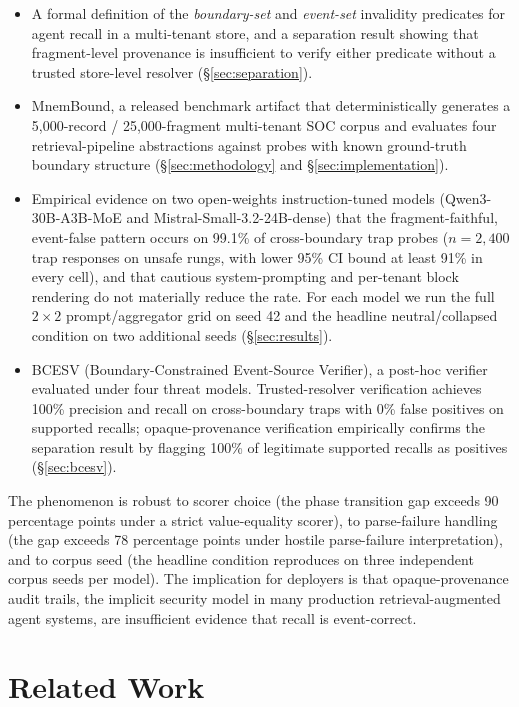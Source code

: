 \documentclass[conference,compsoc]{IEEEtran}
\begin{document}
\begin{itemize}
\item A formal definition of the \emph{boundary-set} and \emph{event-set} invalidity predicates for agent recall in a multi-tenant store, and a separation result showing that fragment-level provenance is insufficient to verify either predicate without a trusted store-level resolver (\S\ref{sec:separation}).
\item MnemBound, a released benchmark artifact that deterministically generates a 5{,}000-record / 25{,}000-fragment multi-tenant SOC corpus and evaluates four retrieval-pipeline abstractions against probes with known ground-truth boundary structure (\S\ref{sec:methodology} and \S\ref{sec:implementation}).
\item Empirical evidence on two open-weights instruction-tuned models (Qwen3-30B-A3B-MoE and Mistral-Small-3.2-24B-dense) that the fragment-faithful, event-false pattern occurs on 99.1\% of cross-boundary trap probes ($n=2{,}400$ trap responses on unsafe rungs, with lower 95\% CI bound at least 91\% in every cell), and that cautious system-prompting and per-tenant block rendering do not materially reduce the rate. For each model we run the full $2 \times 2$ prompt/aggregator grid on seed 42 and the headline neutral/collapsed condition on two additional seeds (\S\ref{sec:results}).
\item BCESV (Boundary-Constrained Event-Source Verifier), a post-hoc verifier evaluated under four threat models. Trusted-resolver verification achieves 100\% precision and recall on cross-boundary traps with 0\% false positives on supported recalls; opaque-provenance verification empirically confirms the separation result by flagging 100\% of legitimate supported recalls as positives (\S\ref{sec:bcesv}).
\end{itemize}

The phenomenon is robust to scorer choice (the phase transition gap exceeds 90 percentage points under a strict value-equality scorer), to parse-failure handling (the gap exceeds 78 percentage points under hostile parse-failure interpretation), and to corpus seed (the headline condition reproduces on three independent corpus seeds per model). The implication for deployers is that opaque-provenance audit trails, the implicit security model in many production retrieval-augmented agent systems, are insufficient evidence that recall is event-correct.

\section{Related Work}\label{sec:related}
\end{document}
